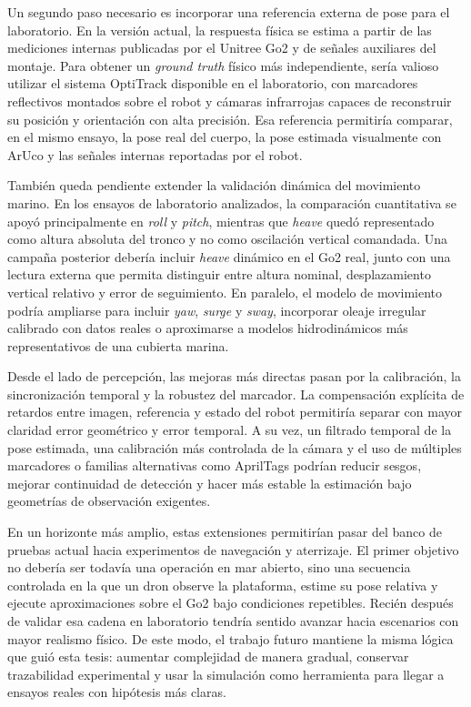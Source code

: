 \documentclass[12pt,a4paper]{report}
\begin{document}
Un segundo paso necesario es incorporar una referencia externa de pose para el
laboratorio. En la versión actual, la respuesta física se estima a partir de las
mediciones internas publicadas por el Unitree Go2 y de señales auxiliares del
montaje. Para obtener un \textit{ground truth} físico más independiente, sería valioso
utilizar el sistema OptiTrack disponible en el laboratorio, con marcadores
reflectivos montados sobre el robot y cámaras infrarrojas capaces de reconstruir
su posición y orientación con alta precisión. Esa referencia permitiría
comparar, en el mismo ensayo, la pose real del cuerpo, la pose estimada
visualmente con ArUco y las señales internas reportadas por el robot.

También queda pendiente extender la validación dinámica del movimiento marino.
En los ensayos de laboratorio analizados, la comparación cuantitativa se apoyó
principalmente en \emph{roll} y \emph{pitch}, mientras que \emph{heave} quedó representado como
altura absoluta del tronco y no como oscilación vertical comandada. Una campaña
posterior debería incluir \emph{heave} dinámico en el Go2 real, junto con una lectura
externa que permita distinguir entre altura nominal, desplazamiento vertical
relativo y error de seguimiento. En paralelo, el modelo de movimiento podría
ampliarse para incluir \emph{yaw}, \emph{surge} y \emph{sway}, incorporar oleaje irregular calibrado
con datos reales o aproximarse a modelos hidrodinámicos más representativos de
una cubierta marina.

Desde el lado de percepción, las mejoras más directas pasan por la calibración,
la sincronización temporal y la robustez del marcador. La compensación explícita
de retardos entre imagen, referencia y estado del robot permitiría separar con
mayor claridad error geométrico y error temporal. A su vez, un filtrado temporal
de la pose estimada, una calibración más controlada de la cámara y el uso de
múltiples marcadores o familias alternativas como AprilTags podrían reducir
sesgos, mejorar continuidad de detección y hacer más estable la estimación bajo
geometrías de observación exigentes.

En un horizonte más amplio, estas extensiones permitirían pasar del banco de
pruebas actual hacia experimentos de navegación y aterrizaje. El primer objetivo
no debería ser todavía una operación en mar abierto, sino una secuencia
controlada en la que un dron observe la plataforma, estime su pose relativa y
ejecute aproximaciones sobre el Go2 bajo condiciones repetibles. Recién después
de validar esa cadena en laboratorio tendría sentido avanzar hacia escenarios
con mayor realismo físico. De este modo, el trabajo futuro mantiene la misma
lógica que guió esta tesis: aumentar complejidad de manera gradual, conservar
trazabilidad experimental y usar la simulación como herramienta para llegar a
ensayos reales con hipótesis más claras.
\end{document}
